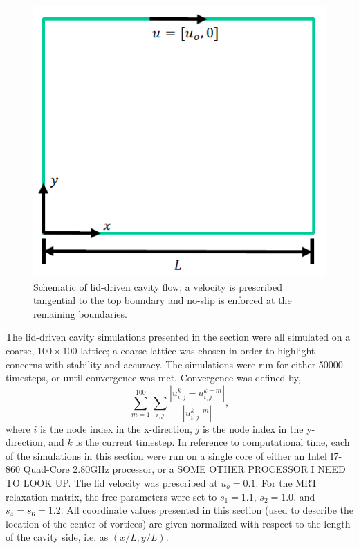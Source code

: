 \documentclass{article}
\begin{document}
\begin{figure}
\includegraphics{figs/lid-driven}
\caption{Schematic of lid-driven cavity flow; a velocity is prescribed tangential to the top boundary and no-slip is enforced at the remaining boundaries.}
\label{fig:lid-driven}
\end{figure}

The lid-driven cavity simulations presented in the section were all simulated on a coarse, $100 \times 100$ lattice; a coarse lattice was chosen in order to highlight concerns with stability and accuracy.
The simulations were run for either 50000 timesteps, or until convergence was met.
Convergence was defined by,
\begin{equation} \label{eq:convergence}
\sum_{m=1}^{100} \sum_{i, j} \frac{|u_{i, j}^k - u_{i, j}^{k-m}|}{|u_{i, j}^{k-m}|},
\end{equation}
\noindent where $i$ is the node index in the x-direction, $j$ is the node index in the y-direction, and $k$ is the current timestep.
In reference to computational time, each of the simulations in this section were run on a single core of either an Intel I7-860 Quad-Core 2.80GHz processor, or a SOME OTHER PROCESSOR I NEED TO LOOK UP.
The lid velocity was prescribed at $u_o = 0.1$.
For the MRT relaxation matrix, the free parameters were set to $s_1 = 1.1$, $s_2 = 1.0$, and $s_4 = s_6 = 1.2$.
All coordinate values presented in this section (used to describe the location of the center of vortices) are given normalized with respect to the length of the cavity side, i.e. as $(x / L, y / L)$.
\end{document}
